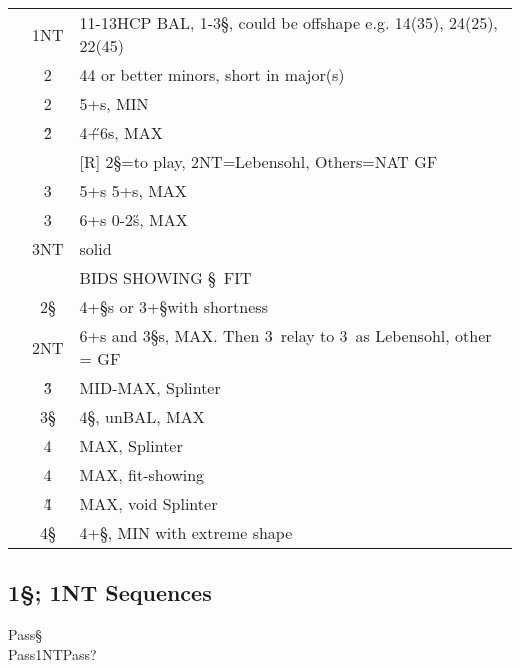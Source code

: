 \begin{longtable}{C{\linklength} C{\bidlength} l}
& 1NT & 11-13HCP BAL, 1-3\S, could be offshape e.g. 14(35), 24(25), 22(45) \\
& 2\C & 44 or better minors, short in major(s) \\
& 2\D & 5+\D s, MIN \\
& 2\H & 4\H+6\D s, MAX \\
&     & [R] 2\S=to play, 2NT=Lebensohl, Others=NAT GF \\
& 3\C & 5+\D s 5+\C s, MAX \\
& 3\D & 6+\D s 0-2\H s, MAX \\
& 3NT & solid \D \\
\hline 
&     & BIDS SHOWING \S\ FIT \\
& 2\S & 4+\S s or 3+\S with shortness \\
& 2NT & 6+\D s and 3\S s, MAX. Then 3\C\ relay to 3\D\ as Lebensohl, other = GF  \\
& 3\H & MID-MAX, Splinter \\
& 3\S & 4\S, unBAL, MAX \\
& 4\C & MAX, Splinter \\
& 4\D & MAX, fit-showing \\
& 4\H & MAX, void Splinter \\
& 4\S & 4+\S, MIN with extreme shape \\
\end{longtable}


\subsection{1\S; 1NT Sequences}

\begin{bidding}
\>\D\>Pass\S\\
\>Pass\>1NT\>Pass\>?\\
\end{bidding}

